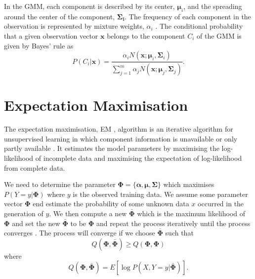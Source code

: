 In the GMM, each component is described by its center, $\boldsymbol{\mu}_i$, and the spreading around the center of the component, $\mathbf{\Sigma_i}$. The frequency of each component in the observation is represented by mixture weights, $\alpha_i$ \cite{stylianou98}. The conditional probability that a given observation vector $\mathbf{x}$ belongs to the component $C_i$ of the GMM is given by Bayes' rule \cite{statistikk} as
\begin{equation}
	\label{eq:bayes}
	P(C_i\vert \mathbf{x}) = \frac{\alpha_i N(\mathbf{x}; \boldsymbol{\mu}_i, \mathbf{\Sigma}_i)}{\sum_{j=1}^{m}\alpha_j N(\mathbf{x}; \boldsymbol{\mu}_j, \mathbf{\Sigma}_j)}.
\end{equation}

\section{Expectation Maximisation} %
\label{sec:expectation_maximisation}
The expectation maximisation, EM , algorithm is an iterative algorithm for unsupervised learning in which component information is unavailable or only partly available \cite{taletek}. It estimates the model parameters by maximising the log-likelihood of incomplete data and maximising the expectation of log-likelihood from complete data.

We need to determine the parameter $\mathbf{\Phi} = \{\boldsymbol{\alpha}, \boldsymbol{\mu}, \mathbf{\Sigma}\}$ which maximises $P(Y=y\vert \mathbf{\Phi})$ where $y$ is the observed training data. We assume some parameter vector $\mathbf{\Phi}$ end estimate the probability of some unknown data $x$ occurred in the generation of $y$. We then compute a new $\bar{\mathbf{\Phi}}$ which is the maximum likelihood of $\mathbf{\Phi}$ and set the new $\bar{\mathbf{\Phi}}$ to be $\mathbf{\Phi}$ and repeat the process iteratively until the process converges \cite{taletek}. The process will converge if we choose $\bar{\mathbf{\Phi}}$ such that 
\begin{equation}
	\label{eq:q_criteria}
	Q(\mathbf{\Phi},\bar{\mathbf{\Phi}})\geq Q(\mathbf{\Phi},\mathbf{\Phi})
\end{equation}
where 
\begin{equation}
	\label{eq:q_function}
	Q(\mathbf{\Phi},\bar{\mathbf{\Phi}}) = E[\log P(X,Y=y\vert \bar{\mathbf{\Phi}})].
\end{equation}


